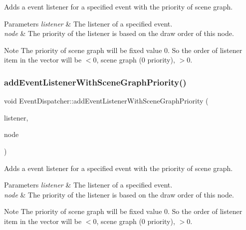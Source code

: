 Adds a event listener for a specified event with the priority of scene graph. 
\begin{DoxyParams}{Parameters}
{\em listener} & The listener of a specified event. \\
\hline
{\em node} & The priority of the listener is based on the draw order of this node. \\
\hline
\end{DoxyParams}
\begin{DoxyNote}{Note}
The priority of scene graph will be fixed value 0. So the order of listener item in the vector will be \textquotesingle{} $<$0, scene graph (0 priority), $>$0\textquotesingle{}. 
\end{DoxyNote}
\mbox{\label{classEventDispatcher_a90b97ea5ad9bff4d684ca5bb6d5618bc}} 
\subsubsection{\texorpdfstring{add\+Event\+Listener\+With\+Scene\+Graph\+Priority()}{addEventListenerWithSceneGraphPriority()}\hspace{0.1cm}{\footnotesize\ttfamily [2/2]}}
{\footnotesize\ttfamily void Event\+Dispatcher\+::add\+Event\+Listener\+With\+Scene\+Graph\+Priority (\begin{DoxyParamCaption}\item[{\hyperlink{classEventListener}{Event\+Listener} $\ast$}]{listener,  }\item[{\hyperlink{classNode}{Node} $\ast$}]{node }\end{DoxyParamCaption})}

Adds a event listener for a specified event with the priority of scene graph. 
\begin{DoxyParams}{Parameters}
{\em listener} & The listener of a specified event. \\
\hline
{\em node} & The priority of the listener is based on the draw order of this node. \\
\hline
\end{DoxyParams}
\begin{DoxyNote}{Note}
The priority of scene graph will be fixed value 0. So the order of listener item in the vector will be \textquotesingle{} $<$0, scene graph (0 priority), $>$0\textquotesingle{}. 
\end{DoxyNote}
\mbox{\label{classEventDispatcher_ae82e15825f3fe6d5d2a32aab9214ddc0}} 
